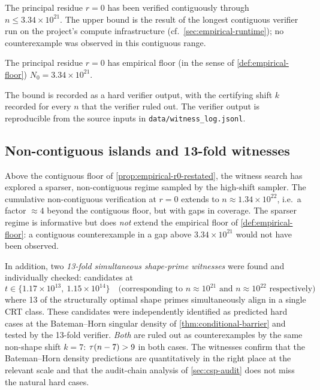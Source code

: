 The principal residue $r = 0$ has been verified contiguously
through $n \le 3.34 \times 10^{21}$. The upper bound is the result
of the longest contiguous verifier run on the project's compute
infrastructure (cf.\ \cref{sec:empirical-runtime}); no
counterexample was observed in this contiguous range.

\begin{proposition}[Empirical floor at $r = 0$, restated]
\label{prop:empirical-r0-restated}
The principal residue $r = 0$ has empirical floor (in the sense of
\cref{def:empirical-floor}) $N_0 = 3.34 \times 10^{21}$.
\end{proposition}

The bound is recorded as a hard verifier output, with the
certifying shift $k$ recorded for every $n$ that the verifier
ruled out. The verifier output is reproducible from the source
inputs in \texttt{data/witness\_log.jsonl}.

\subsection{Non-contiguous islands and 13-fold witnesses}
\label{sec:empirical-islands}

Above the contiguous floor of \cref{prop:empirical-r0-restated},
the witness search has explored a sparser, non-contiguous regime
sampled by the high-shift sampler. The cumulative non-contiguous
verification at $r = 0$ extends to $n \approx 1.34 \times 10^{22}$,
i.e.\ a factor $\approx 4$ beyond the contiguous floor, but with
gaps in coverage. The sparser regime is informative but does
\emph{not} extend the empirical floor of
\cref{def:empirical-floor}: a contiguous counterexample in a gap
above $3.34 \times 10^{21}$ would not have been observed.

In addition, two \emph{13-fold simultaneous shape-prime witnesses}
were found and individually checked: candidates at
\[
t \in \{1.17 \times 10^{13},\ 1.15 \times 10^{14}\}
\quad \text{(corresponding to $n \approx 10^{21}$ and $n \approx
10^{22}$ respectively)}
\]
where 13 of the structurally optimal shape primes simultaneously
align in a single CRT class. These candidates were independently
identified as predicted hard cases at the Bateman--Horn singular
density of \cref{thm:conditional-barrier} and tested by the 13-fold
verifier. \emph{Both} are ruled out as counterexamples by the same
non-shape shift $k = 7$: $\tau(n - 7) > 9$ in both cases. The
witnesses confirm that the Bateman--Horn density predictions are
quantitatively in the right place at the relevant scale and that
the audit-chain analysis of \cref{sec:csp-audit} does not miss
the natural hard cases.

